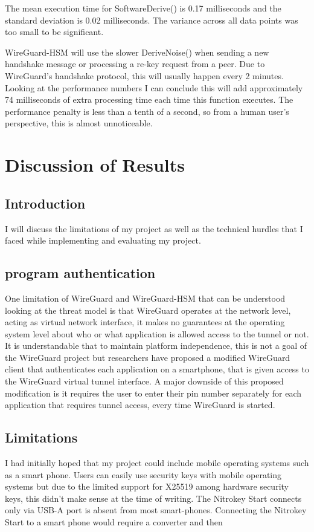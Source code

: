 \documentclass [11pt, proquest] {uwthesis}[2020/02/24]
\begin{document}
The mean execution time for SoftwareDerive() is 0.17 milliseconds and the standard deviation is 0.02 milliseconds. The variance across all data points was too small to be significant.

WireGuard-HSM will use the slower DeriveNoise() when sending a new handshake message or processing a re-key request from a peer. Due to WireGuard's handshake protocol, this will usually happen every 2 minutes. Looking at the performance numbers I can conclude this will add approximately 74 milliseconds of extra processing time each time this function executes. The performance penalty is less than a tenth of a second, so from a human user's perspective, this is almost unnoticeable. 

\chapter {Discussion of Results}
\section {Introduction}
I will discuss the limitations of my project as well as the technical hurdles that I faced while implementing and evaluating my project.

\section{program authentication}
One limitation of WireGuard and WireGuard-HSM that can be understood looking at the threat model is that WireGuard operates at the network level, acting as virtual network interface, it makes no guarantees at the operating system level about who or what application is allowed access to the tunnel or not. It is understandable that to maintain platform independence, this is not a goal of the WireGuard project but researchers have proposed a modified WireGuard client that authenticates each application on a smartphone, that is given access to the WireGuard virtual tunnel interface. A major downside of this proposed modification is it requires the user to enter their pin number separately for each application that requires tunnel access, every time WireGuard is started.\cite{wu_sewg_2020}

\section {Limitations}
I had initially hoped that my project could include mobile operating systems such as a smart phone. Users can easily use security keys with mobile operating systems but due to the limited support for X25519 among hardware security keys, this didn't make sense at the time of writing. The Nitrokey Start connects only via USB-A port is absent from most smart-phones. Connecting the Nitrokey Start to a smart phone would require a converter and then
\end{document}
